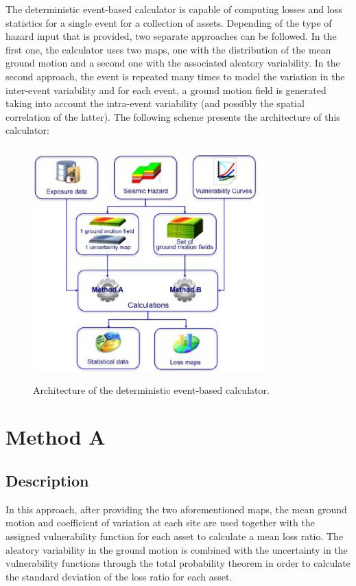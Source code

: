 The deterministic event-based calculator is capable of computing losses and loss statistics for a single event for a collection of assets. Depending of the type of hazard input that is provided, two separate approaches can be followed. In the first one, the calculator uses two maps, one with the distribution of the mean ground motion and a second one with the associated aleatory variability. In the second approach, the event is repeated many times to model the variation in the inter-event variability and for each event, a ground motion field is generated taking into account the intra-event variability (and possibly the spatial correlation of the latter). The following scheme presents the architecture of this calculator:

\begin{figure}[ht]
\centering
\includegraphics[width=9cm,height=9cm]{./Figures/Part_Risk/Scheme_Deter_calc.eps}
\caption{Architecture of the deterministic event-based calculator.}
\label{fig:Scheme_deter_calc}
\end{figure}

\section{Method A} 
\subsection{Description}
In this approach, after providing the two aforementioned maps, the mean ground motion and coefficient of variation at each site are used together with the assigned vulnerability function for each asset  to calculate a mean loss ratio. The aleatory variability in the ground motion is combined with the uncertainty in the vulnerability functions through the total probability theorem in order to calculate the standard deviation of the loss ratio for each asset.

